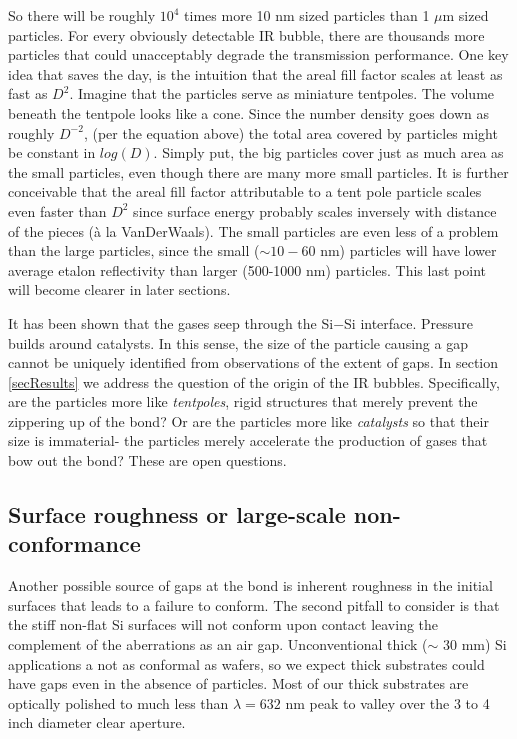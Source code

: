 \documentclass[osajnl,preprint,showpacs,superscriptaddress,12pt]{revtex4-1} %
\begin{document}
So there will be roughly $10^4$ times more 10 nm sized particles than 1 $\mu$m sized particles.  For every obviously detectable IR bubble, there are thousands more particles that could unacceptably degrade the transmission performance.  One key idea that saves the day, is the intuition that the areal fill factor scales at least as fast as $D^2$.  Imagine that the particles serve as miniature tentpoles.  The volume beneath the tentpole looks like a cone.  Since the number density goes down as roughly $D^{-2}$, (per the equation above) the total area covered by particles might be constant in $log(D)$.  Simply put, the big particles cover just as much area as the small particles, even though there are many more small particles.  It is further conceivable that the areal fill factor attributable to a tent pole particle scales even faster than $D^2$ since surface energy probably scales inversely with distance of the pieces (\`a la VanDerWaals).  The small particles are even less of a problem than the large particles, since the small ($\sim10-60$ nm) particles will have lower average etalon reflectivity than larger (500-1000 nm) particles.  This last point will become clearer in later sections.

It has been shown\cite{1992JEMat..21..669M} that the gases seep through the Si$-$Si interface.  Pressure builds around catalysts.  In this sense, the size of the particle causing a gap cannot be uniquely identified from observations of the extent of gaps.  In section \ref{secResults} we address the question of the origin of the IR bubbles.  Specifically, are the particles more like \emph{tentpoles}, rigid structures that merely prevent the zippering up of the bond?  Or are the particles more like \emph{catalysts} so that their size is immaterial- the particles merely accelerate the production of gases that bow out the bond?  These are open questions.

\subsection{Surface roughness or large-scale non-conformance}
Another possible source of gaps at the bond is inherent roughness in the initial surfaces that leads to a failure to conform.  The second pitfall to consider is that the stiff non-flat Si surfaces will not conform upon contact leaving the complement of the aberrations as an air gap. Unconventional thick ($\sim$ 30 mm) Si applications a not as conformal as wafers, so we expect thick substrates could have gaps even in the absence of particles.  Most of our thick substrates are optically polished to much less than $\lambda = 632$ nm peak to valley over the 3 to 4 inch diameter clear aperture.  
\end{document}
